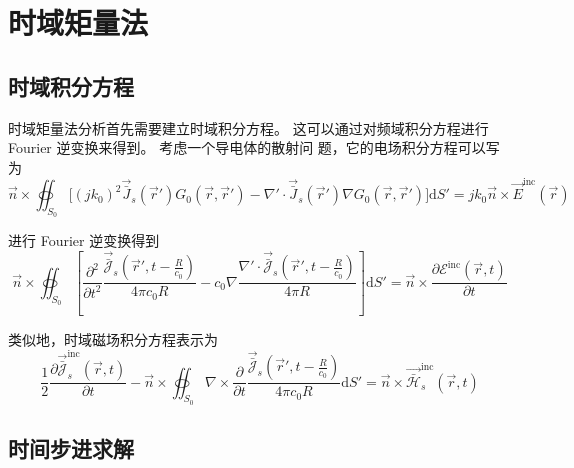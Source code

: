 \section{时域矩量法}

\subsection{时域积分方程}

\par 时域矩量法分析首先需要建立时域积分方程。
这可以通过对频域积分方程进行 Fourier 逆变换来得到。
考虑一个导电体的散射问
题，它的电场积分方程可以写为
\begin{equation}
    \vec{n}\times
    \oiint_{S_0} \Big[
        (jk_0)^2\vec{\bar{J}}_s(\vec{r}')G_0(\vec{r}, \vec{r}')
        -\nabla'\cdot\vec{\bar{J}}_s(\vec{r}')\nabla G_0(\vec{r}, \vec{r}')
    \Big]\text{d}S'
    =jk_0\vec{n}\times\vec{E}^{\text{inc}}(\vec{r})
\end{equation}
\par 进行 Fourier 逆变换得到
\begin{equation}
    \vec{n}\times
    \oiint_{S_0} \left[
        \frac{\partial^2}{\partial t^2}    
        \frac{\vec{\bar{\mathscr{J}}}_s\left(\vec{r}',t-\frac{R}{c_0}\right)}{4\pi c_0R}
        -c_0\nabla 
        \frac{\nabla' \cdot
        \vec{\bar{\mathscr{J}}}_s\left(\vec{r}',t-\frac{R}{c_0}\right)}{4\pi R}
    \right]\text{d}S'
    =\vec{n}\times
    \frac{\partial \mathscr{E}^{\text{inc}}(\vec{r},t)}{\partial t}
\end{equation}
\par 类似地，时域磁场积分方程表示为
\begin{equation}
    \frac{1}{2}
    \frac{\partial \vec{\bar{\mathscr{J}}}_s^{\text{inc}}(\vec{r},t)}{\partial t}
    -\vec{n}\times
    \oiint_{S_0} \nabla \times
    \frac{\partial}{\partial t}
    \frac{\vec{\bar{\mathscr{J}}}_s\left(\vec{r}',t-\frac{R}{c_0}\right)}{4\pi c_0R}
    \text{d}S'
    =\vec{n}\times
    \vec{\bar{\mathscr{H}}}_s^{\text{inc}}(\vec{r},t)
\end{equation}

\subsection{时间步进求解}


